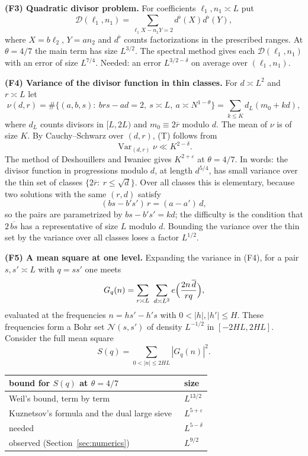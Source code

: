 \documentclass[11pt]{amsart}
\theoremstyle{definition}
\theoremstyle{remark}
\numberwithin{equation}{section}
\newcommand{\eps}{\varepsilon}
\newcommand{\inv}[1]{\overline{#1}}
\begin{document}
\medskip
\noindent\textbf{(F3) Quadratic divisor problem.}  For coefficients
$\ell_1,n_1\asymp L$ put
\[
 \mathcal D(\ell_1,n_1)=\sum_{\ell_1X-n_1Y=2}d^\flat(X)d^\flat(Y),
\]
where $X=b\ell_2$, $Y=an_2$ and $d^\flat$ counts factorizations in the
prescribed ranges.  At $\theta=4/7$ the main term has size $L^{3/2}$.  The
spectral method gives each $\mathcal D(\ell_1,n_1)$ with an error of size
$L^{7/4}$.  Needed: an error $L^{3/2-\delta}$ on average over
$(\ell_1,n_1)$.

\medskip
\noindent\textbf{(F4) Variance of the divisor function in thin classes.}
For $d\asymp L^2$ and $r\asymp L$ let
\begin{equation}\label{eq:nu}
 \nu(d,r)=\#\{(a,b,s):\ brs-ad=2,\ s\asymp L,\ a\asymp N^{1-\theta}\}
 =\sum_{k\le K}d_L(m_0+kd),
\end{equation}
where $d_L$ counts divisors in $[L,2L)$ and $m_0\equiv2\inv r$ modulo $d$.
The mean of $\nu$ is of size $K$.  By Cauchy--Schwarz over $(d,r)$, (T)
follows from
\[
 \operatorname{Var}_{(d,r)}\nu\ll K^{2-\delta}.
\]
The method of Deshouillers and Iwaniec gives $K^{2+\eps}$ at $\theta=4/7$.
In words: the divisor function in progressions modulo $d$, at length
$d^{5/4}$, has small variance over the thin set of classes
$\{2\inv r:\ r\le\sqrt d\}$.  Over all classes this is elementary, because
two solutions with the same $(r,d)$ satisfy
\[
 (bs-b's')\,r=(a-a')\,d ,
\]
so the pairs are parametrized by $bs-b's'=kd$; the difficulty is the
condition that $2\,\inv{bs}$ has a representative of size $L$ modulo $d$.
Bounding the variance over the thin set by the variance over all classes
loses a factor $L^{1/2}$.

\medskip
\noindent\textbf{(F5) A mean square at one level.}  Expanding the variance
in (F4), for a pair $s,s'\asymp L$ with $q=ss'$ one meets
\begin{equation}\label{eq:G}
 G_q(n)=\sum_{r\asymp L}\ \sum_{d\asymp L^2}
 e\Bigl(\frac{2n\,\inv d}{rq}\Bigr),
\end{equation}
evaluated at the frequencies $n=hs'-h's$ with $0<|h|,|h'|\le H$.  These
frequencies form a Bohr set $\mathcal N(s,s')$ of density $L^{-1/2}$ in
$[-2HL,2HL]$.  Consider the full mean square
\[
 S(q)=\sum_{0<|n|\le 2HL}|G_q(n)|^2 .
\]
\begin{center}
\begin{tabular}{ll}
bound for $S(q)$ at $\theta=4/7$ & size \\ \hline
Weil's bound, term by term & $L^{13/2}$\\
Kuznetsov's formula and the dual large sieve~\cite{DI82} & $L^{5+\eps}$\\
needed & $L^{5-\delta}$\\
observed (Section~\ref{sec:numerics}) & $L^{9/2}$
\end{tabular}
\end{center}
\end{document}
